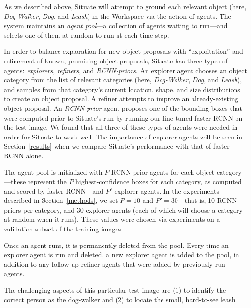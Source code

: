 \documentclass[conference]{IEEEtran}
\begin{document}
As we described above, Situate will attempt to ground each relevant
object (here, {\it Dog-Walker}, {\it Dog}, and {\it Leash}) in the
Workspace via the action of agents.  The system maintains an
{\it agent pool}---a collection of agents waiting to run---and selects
one of them at random to run at each time step.

In order to balance exploration for new object proposals with
``exploitation'' and refinement of known, promising object proposals,
Situate has three types of agents: {\it explorers}, {\it refiners},
and {\it RCNN-priors}.  An explorer agent chooses an object category
from the list of relevant categories (here, {\it Dog-Walker}, {\it
  Dog}, and {\it Leash}), and samples from that category's current
location, shape, and size distributions to create an object proposal.
A refiner attempts to improve an already-existing object proposal.  An
{\it RCNN-prior} agent proposes one of the bounding boxes that were
computed prior to Situate's run by running our fine-tuned faster-RCNN
on the test image.  We found that all three of these types of agents
were needed in order for Situate to work well.  The importance of
explorer agents will be seen in Section~\ref{results} when we compare
Situate's performance with that of faster-RCNN alone.

The agent pool is initialized with $P$ RCNN-prior agents for each
object category---these represent the $P$ highest-confidence boxes for
each category, as computed and scored by faster-RCNN---and $P'$
explorer agents.  In the experiments described in
Section~\ref{methods}, we set $P=10$ and $P'=30$---that is, 10
RCNN-priors per category, and 30 explorer agents (each of which will choose
a category at random when it runs).  These values were chosen via experiments on a validation subset of
the training images.

Once an agent runs, it is permanently deleted from the pool.  Every
time an explorer agent is run and deleted, a new explorer agent is
added to the pool, in addition to any follow-up refiner agents that
were added by previously run agents.

The challenging aspects of this particular test image are (1) to identify the correct person as
the dog-walker and (2) to locate the small, hard-to-see leash.
\end{document}
